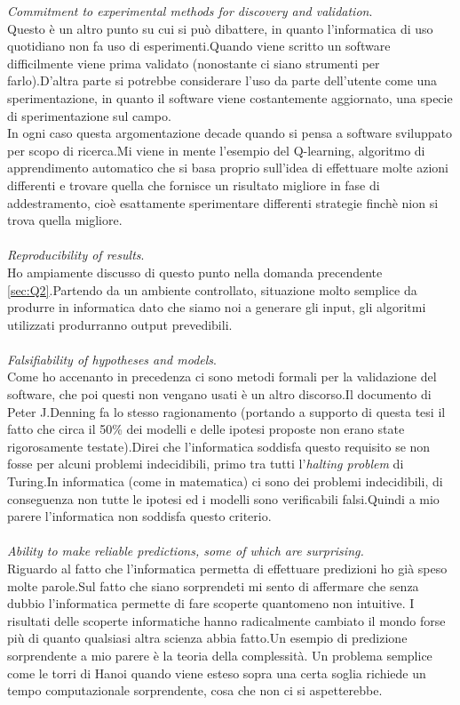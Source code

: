 \documentclass[a4paper]{article}
\begin{document}
\emph{Commitment to experimental methods for discovery and validation}.\\Questo è un altro punto su cui si può dibattere, in quanto l'informatica di uso quotidiano non fa uso di esperimenti.Quando viene scritto un software difficilmente viene prima validato (nonostante ci siano strumenti per farlo).D'altra parte si potrebbe considerare l'uso da parte dell'utente come una sperimentazione, in quanto il software viene costantemente aggiornato, una specie di sperimentazione sul campo.\\In ogni caso questa argomentazione decade quando si pensa a software sviluppato per scopo di ricerca.Mi viene in mente l'esempio del Q-learning, algoritmo di apprendimento automatico che si basa proprio sull'idea di effettuare molte azioni differenti e trovare quella che fornisce un risultato migliore in fase di addestramento, cioè esattamente sperimentare differenti strategie finchè nion si trova quella migliore.\\\\

\emph{Reproducibility of results}.\\Ho ampiamente discusso di questo punto nella domanda precendente \ref{sec:Q2}.Partendo da un ambiente controllato, situazione molto semplice da produrre in informatica dato che siamo noi a generare gli input, gli algoritmi utilizzati produrranno output prevedibili.\\\\

\emph{Falsifiability of hypotheses and models}.\\Come ho accenanto in precedenza ci sono metodi formali per la validazione del software, che poi questi non vengano usati è un altro discorso.Il documento di Peter J.Denning fa lo stesso ragionamento (portando a supporto di questa tesi il fatto che circa il 50\% dei modelli e delle ipotesi proposte non erano state rigorosamente testate).Direi che l'informatica soddisfa questo requisito se non fosse per alcuni problemi indecidibili, primo tra tutti l'\emph{halting problem} di Turing.In informatica (come in matematica) ci sono dei problemi indecidibili, di conseguenza non tutte le ipotesi ed i modelli sono verificabili falsi.Quindi a mio parere l'informatica non soddisfa questo criterio.\\\\

\emph{Ability to make reliable predictions, some of which are surprising.}\\Riguardo al fatto che l'informatica permetta di effettuare predizioni ho già speso molte parole.Sul fatto che siano sorprendeti mi sento di affermare che senza dubbio l'informatica permette di fare scoperte quantomeno non intuitive.
I risultati delle scoperte informatiche hanno radicalmente cambiato il mondo forse più di quanto qualsiasi altra scienza abbia fatto.Un esempio di predizione sorprendente a mio parere è la teoria della complessità. Un problema semplice come le torri di Hanoi quando viene esteso sopra una certa soglia richiede un tempo computazionale sorprendente, cosa che non ci si aspetterebbe.

\printbibliography
\end{document}
